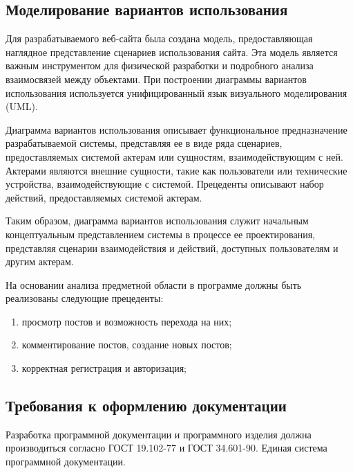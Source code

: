 \subsection{Моделирование вариантов использования}

Для разрабатываемого веб-сайта была создана модель, предоставляющая наглядное представление сценариев использования сайта. Эта модель является важным инструментом для физической разработки и подробного анализа взаимосвязей между объектами. При построении диаграммы вариантов использования используется унифицированный язык визуального моделирования (UML).

Диаграмма вариантов использования описывает функциональное предназначение разрабатываемой системы, представляя ее в виде ряда сценариев, предоставляемых системой актерам или сущностям, взаимодействующим с ней. Актерами являются внешние сущности, такие как пользователи или технические устройства, взаимодействующие с системой. Прецеденты описывают набор действий, предоставляемых системой актерам.

Таким образом, диаграмма вариантов использования служит начальным концептуальным представлением системы в процессе ее проектирования, представляя сценарии взаимодействия и действий, доступных пользователям и другим актерам.

На основании анализа предметной области в программе должны быть реализованы следующие прецеденты:
\begin{enumerate}
\item просмотр постов и возможность перехода на них;
\item комментирование постов, создание новых постов;
\item корректная регистрация и авторизация;
\end{enumerate}

\subsection{Требования к оформлению документации}

Разработка программной документации и программного изделия должна производиться согласно ГОСТ 19.102-77 и ГОСТ 34.601-90. Единая система программной документации.
